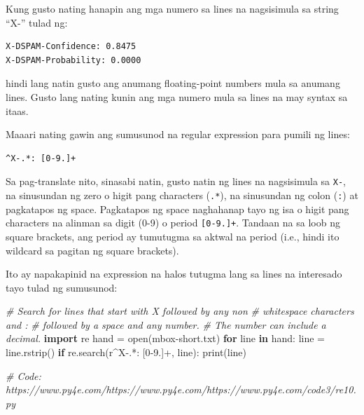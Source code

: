 \documentclass[10pt,]{book}
\newenvironment{Shaded}{}{}
\newcommand{\BuiltInTok}[1]{\textcolor[rgb]{0.00,0.50,0.00}{#1}}
\newcommand{\CommentTok}[1]{\textcolor[rgb]{0.38,0.63,0.69}{\textit{#1}}}
\newcommand{\ControlFlowTok}[1]{\textcolor[rgb]{0.00,0.44,0.13}{\textbf{#1}}}
\newcommand{\DecValTok}[1]{\textcolor[rgb]{0.25,0.63,0.44}{#1}}
\newcommand{\ImportTok}[1]{\textcolor[rgb]{0.00,0.50,0.00}{\textbf{#1}}}
\newcommand{\KeywordTok}[1]{\textcolor[rgb]{0.00,0.44,0.13}{\textbf{#1}}}
\newcommand{\NormalTok}[1]{#1}
\newcommand{\OperatorTok}[1]{\textcolor[rgb]{0.40,0.40,0.40}{#1}}
\newcommand{\PreprocessorTok}[1]{\textcolor[rgb]{0.74,0.48,0.00}{#1}}
\newcommand{\StringTok}[1]{\textcolor[rgb]{0.25,0.44,0.63}{#1}}
\newcommand{\VerbatimStringTok}[1]{\textcolor[rgb]{0.25,0.44,0.63}{#1}}
\begin{document}
Kung gusto nating hanapin ang mga numero sa lines na nagsisimula sa
string ``X-'' tulad ng:

{\small
\begin{verbatim}
X-DSPAM-Confidence: 0.8475
X-DSPAM-Probability: 0.0000
\end{verbatim}
}

hindi lang natin gusto ang anumang floating-point numbers mula sa
anumang lines. Gusto lang nating kunin ang mga numero mula sa lines na
may syntax sa itaas.

Maaari nating gawin ang sumusunod na regular expression para pumili ng
lines:

{\small
\begin{verbatim}
^X-.*: [0-9.]+
\end{verbatim}
}

Sa pag-translate nito, sinasabi natin, gusto natin ng lines na
nagsisimula sa \texttt{X-}, na sinusundan ng zero o higit pang
characters (\texttt{.*}), na sinusundan ng colon (\texttt{:}) at
pagkatapos ng space. Pagkatapos ng space naghahanap tayo ng isa o higit
pang characters na alinman sa digit (0-9) o period \texttt{{[}0-9.{]}+}.
Tandaan na sa loob ng square brackets, ang period ay tumutugma sa aktwal
na period (i.e., hindi ito wildcard sa pagitan ng square brackets).

Ito ay napakapinid na expression na halos tutugma lang sa lines na
interesado tayo tulad ng sumusunod:

\begin{Shaded}
\begin{Highlighting}[]
\CommentTok{\# Search for lines that start with \textquotesingle{}X\textquotesingle{} followed by any non}
\CommentTok{\# whitespace characters and \textquotesingle{}:\textquotesingle{}}
\CommentTok{\# followed by a space and any number.}
\CommentTok{\# The number can include a decimal.}
\ImportTok{import}\NormalTok{ re}
\NormalTok{hand }\OperatorTok{=} \BuiltInTok{open}\NormalTok{(}\StringTok{\textquotesingle{}mbox{-}short.txt\textquotesingle{}}\NormalTok{)}
\ControlFlowTok{for}\NormalTok{ line }\KeywordTok{in}\NormalTok{ hand:}
\NormalTok{    line }\OperatorTok{=}\NormalTok{ line.rstrip()}
    \ControlFlowTok{if}\NormalTok{ re.search(}\VerbatimStringTok{r\textquotesingle{}}\DecValTok{\^{}}\VerbatimStringTok{X{-}}\DecValTok{.}\OperatorTok{*}\VerbatimStringTok{: }\PreprocessorTok{[0{-}9.]}\OperatorTok{+}\VerbatimStringTok{\textquotesingle{}}\NormalTok{, line):}
        \BuiltInTok{print}\NormalTok{(line)}

\CommentTok{\# Code: https://www.py4e.com/https://www.py4e.com/https://www.py4e.com/code3/re10.py}
\end{Highlighting}
\end{Shaded}
\end{document}
